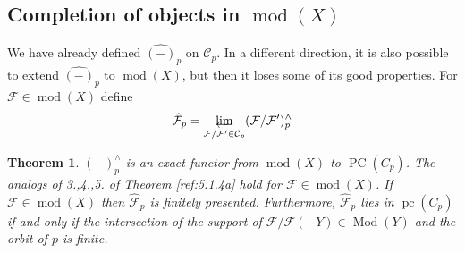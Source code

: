 \documentclass{amsproc}
\def\Cscr{{\mathcal C}}
\def\Fscr{{\mathcal F}}
\def\coh{\operatorname {mod}}
\def\Qch{\operatorname {Mod}}
\let\invlim\projlim
\DeclareMathOperator{\PC}{PC}
\DeclareMathOperator{\pc}{pc}
\newtheorem{theorems}[lemmas]{Theorem}
\theoremstyle{definition}
\theoremstyle{remark}
\def\invlim{\mathop{\vtop{\baselineskip -100pt\lineskip -1pt\lineskiplimit 0pt
\setbox0\hbox{\upshape lim}\copy0\hbox to \wd0{\leftarrowfill}}}\limits}
\numberwithin{equation}{section}
\numberwithin{table}{section}
\numberwithin{figure}{section}
\begin{document}
\subsection[Completion of objects in {$\coh(X)$}]{Completion of objects in { $\coh(X)$}}
\label{ref:5.3a}
We have already defined $\hat{(-)}_{p}$ on $\Cscr_p$. In a different
direction, it is also possible to extend $\hat{(-)}_{p}$ to $\coh(X)$,
but then it loses some of its good properties. For $\Fscr\in\coh(X)$
define
\[
\hat{\Fscr}_{p}=
\invlim_{\Fscr/\Fscr'\in\Cscr_p} (\Fscr/\Fscr')^\wedge_{p}
\]
\begin{theorems}
\label{ref:5.3.1a}
$(-)^\wedge_{p}$ is an exact functor from $\coh(X)$ to $\PC(C_p)$.
The analogs of 3.,4.,5. of Theorem \ref{ref:5.1.4a} hold for
$\Fscr\in\coh(X)$.  If $\Fscr\in\coh(X)$ then $\hat{\Fscr}_{p}$ is
finitely presented.  Furthermore, $\hat{\Fscr}_{p}$ lies in $\pc(C_p)$
if and only if the intersection of the support of $\Fscr/\Fscr(-Y)\in
\Qch(Y)$ and the orbit of $p$ is finite.
\end{theorems}
\end{document}
